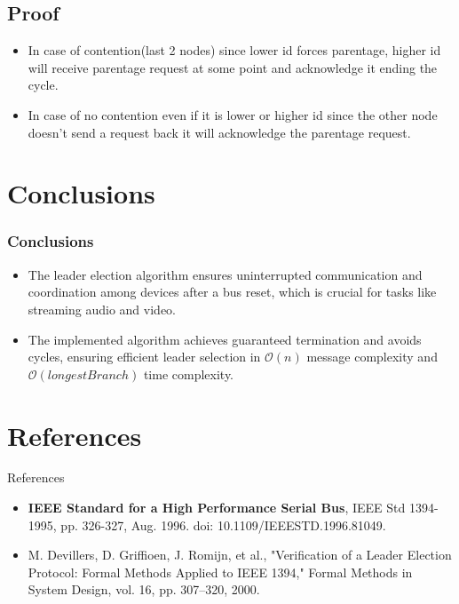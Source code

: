\documentclass[11pt]{beamer}              %
\begin{document}
\subsection{Proof}
\begin{frame}
	\begin{itemize}
		\item In case of contention(last 2 nodes) since lower id forces parentage, higher id will receive parentage request at some point and acknowledge it ending the cycle.
		\item In case of no contention even if it is lower or higher id since the other node doesn't send a request back it will acknowledge the parentage request.
	\end{itemize}
\end{frame}



\section{Conclusions}
\begin{frame}
\frametitle{Conclusions}
\begin{itemize}
\item The leader election algorithm ensures uninterrupted communication and coordination among devices after a bus reset, which is crucial for tasks like streaming audio and video.
\item The implemented algorithm achieves guaranteed termination and avoids cycles, ensuring efficient leader selection in $\mathcal{O}(n)$ message complexity and $\mathcal{O}(longest Branch)$ time complexity.
\end{itemize}

\end{frame}

\section*{References}
\begin{frame}{References}
    \tiny
    \begin{itemize}
        \item[\textbullet] \textbf{IEEE Standard for a High Performance Serial Bus}, IEEE Std 1394-1995, pp. 326-327, Aug. 1996. doi: 10.1109/IEEESTD.1996.81049.
        \item[\textbullet] M. Devillers, D. Griffioen, J. Romijn, et al., "Verification of a Leader Election Protocol: Formal Methods Applied to IEEE 1394," Formal Methods in System Design, vol. 16, pp. 307–320, 2000.
    \end{itemize}
\end{frame}




\thankslide
\end{document}
